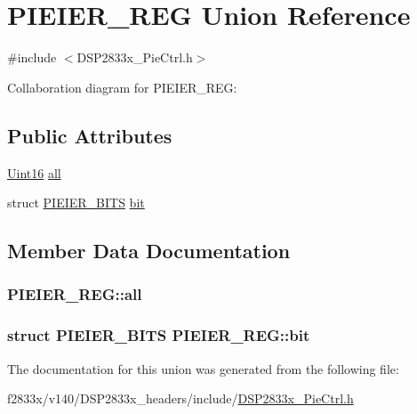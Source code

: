 \hypertarget{union_p_i_e_i_e_r___r_e_g}{}\section{P\+I\+E\+I\+E\+R\+\_\+\+R\+E\+G Union Reference}
\label{union_p_i_e_i_e_r___r_e_g}


{\ttfamily \#include $<$D\+S\+P2833x\+\_\+\+Pie\+Ctrl.\+h$>$}



Collaboration diagram for P\+I\+E\+I\+E\+R\+\_\+\+R\+E\+G\+:
\subsection*{Public Attributes}
\begin{DoxyCompactItemize}
\item 
\hyperlink{_d_s_p2833x___device_8h_a59a9f6be4562c327cbfb4f7e8e18f08b}{Uint16} \hyperlink{union_p_i_e_i_e_r___r_e_g_a82870c8b26f638854be3b49155aa6888}{all}
\item 
struct \hyperlink{struct_p_i_e_i_e_r___b_i_t_s}{P\+I\+E\+I\+E\+R\+\_\+\+B\+I\+T\+S} \hyperlink{union_p_i_e_i_e_r___r_e_g_a173badef279624b2180b01dc6e5ded4e}{bit}
\end{DoxyCompactItemize}


\subsection{Member Data Documentation}
\hypertarget{union_p_i_e_i_e_r___r_e_g_a82870c8b26f638854be3b49155aa6888}{}
\subsubsection[{all}]{ P\+I\+E\+I\+E\+R\+\_\+\+R\+E\+G\+::all}\label{union_p_i_e_i_e_r___r_e_g_a82870c8b26f638854be3b49155aa6888}
\hypertarget{union_p_i_e_i_e_r___r_e_g_a173badef279624b2180b01dc6e5ded4e}{}
\subsubsection[{bit}]{\setlength{\rightskip}{0pt plus 5cm}struct {\bf P\+I\+E\+I\+E\+R\+\_\+\+B\+I\+T\+S} P\+I\+E\+I\+E\+R\+\_\+\+R\+E\+G\+::bit}\label{union_p_i_e_i_e_r___r_e_g_a173badef279624b2180b01dc6e5ded4e}


The documentation for this union was generated from the following file\+:\begin{DoxyCompactItemize}
\item 
f2833x/v140/\+D\+S\+P2833x\+\_\+headers/include/\hyperlink{_d_s_p2833x___pie_ctrl_8h}{D\+S\+P2833x\+\_\+\+Pie\+Ctrl.\+h}\end{DoxyCompactItemize}
